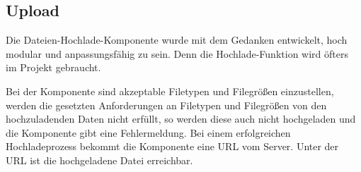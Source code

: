 \subsection{Upload}
\label{sec:wizard:upload}
Die Dateien-Hochlade-Komponente wurde mit dem Gedanken entwickelt, hoch modular und anpassungsfähig zu sein. Denn die Hochlade-Funktion wird öfters im Projekt gebraucht.

Bei der Komponente sind akzeptable Filetypen und Filegrößen einzustellen, werden die gesetzten Anforderungen an Filetypen und Filegrößen von den hochzuladenden Daten nicht erfüllt, so werden diese auch nicht hochgeladen und die Komponente gibt eine Fehlermeldung.
Bei einem erfolgreichen Hochladeprozess bekommt die Komponente eine URL vom Server. Unter der URL ist die hochgeladene Datei erreichbar.








